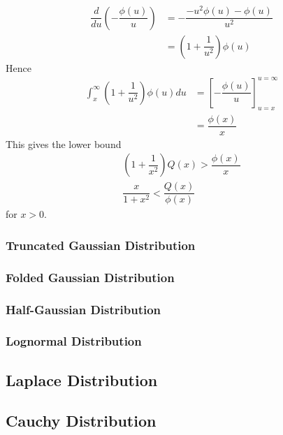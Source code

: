 \documentclass[11pt]{report} %
\begin{document}
\begin{align}
\dfrac{d}{du}\left(-\dfrac{\phi\left(u\right)}{u}\right) &= -\dfrac{-u^{2}\phi\left(u\right) - \phi\left(u\right)}{u^{2}} \\
&= \left(1 + \dfrac{1}{u^{2}}\right)\phi\left(u\right)
\end{align}
Hence
\begin{align}
\int_{x}^{\infty}\left(1 + \dfrac{1}{u^{2}}\right)\phi\left(u\right)du &= \left[-\dfrac{\phi\left(u\right)}{u}\right]_{u = x}^{u = \infty} \\
&= \dfrac{\phi\left(x\right)}{x}
\end{align}
This gives the lower bound
\begin{gather}
\left(1 + \dfrac{1}{x^{2}}\right)Q\left(x\right) > \dfrac{\phi\left(x\right)}{x} \\
\dfrac{x}{1 + x^{2}} < \dfrac{Q\left(x\right)}{\phi\left(x\right)}
\end{gather}
for $x > 0$.

\subsubsection{Truncated Gaussian Distribution}

\subsubsection{Folded Gaussian Distribution}

\subsubsection{Half-Gaussian Distribution}

\subsubsection{Lognormal Distribution}

\subsection{Laplace Distribution}

\subsection{Cauchy Distribution}
\end{document}
